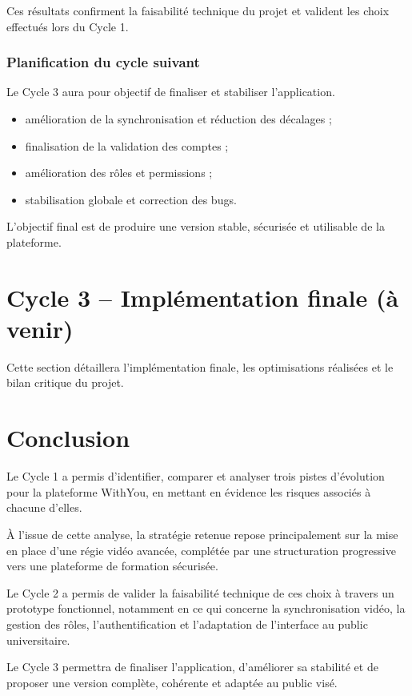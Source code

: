 \documentclass[12pt,a4paper]{report}
\begin{document}
Ces résultats confirment la faisabilité technique du projet et valident les
choix effectués lors du Cycle 1.

\subsection{Planification du cycle suivant}

Le Cycle 3 aura pour objectif de finaliser et stabiliser l’application.

\begin{itemize}
  \item amélioration de la synchronisation et réduction des décalages ;
  \item finalisation de la validation des comptes ;
  \item amélioration des rôles et permissions ;
  \item stabilisation globale et correction des bugs.
\end{itemize}

L’objectif final est de produire une version stable, sécurisée et utilisable
de la plateforme.

\chapter{Cycle 3 – Implémentation finale (à venir)}
Cette section détaillera l’implémentation finale, les optimisations réalisées et le bilan critique du projet.

\chapter{Conclusion}

Le Cycle 1 a permis d’identifier, comparer et analyser trois pistes d’évolution pour la plateforme WithYou, en mettant en évidence les risques associés à chacune d’elles.

À l’issue de cette analyse, la stratégie retenue repose principalement sur la mise en place d’une régie vidéo avancée, complétée par une structuration progressive vers une plateforme de formation sécurisée.

Le Cycle 2 a permis de valider la faisabilité technique de ces choix à travers un prototype fonctionnel, notamment en ce qui concerne la synchronisation vidéo, la gestion des rôles, l’authentification et l’adaptation de l’interface au public universitaire.

Le Cycle 3 permettra de finaliser l’application, d’améliorer sa stabilité et de proposer une version complète, cohérente et adaptée au public visé.
\end{document}
